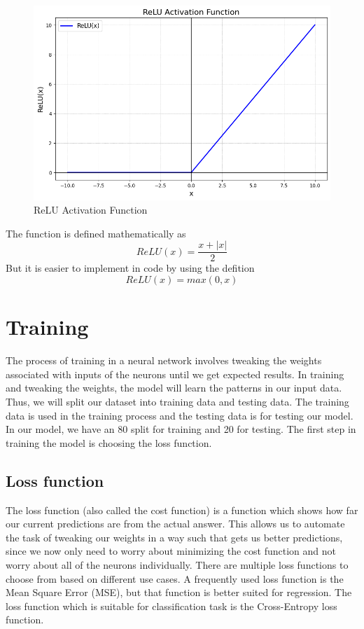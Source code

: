 \documentclass[a4paper,oneside,12pt]{report}
\begin{document}
\begin{figure}[htbp]
\centering
\includegraphics[width=.9\linewidth]{Neural_Network/2025-04-26_21-13-41_Relu-activation-function.png}
\caption{\label{fig:org78b14c4}ReLU Activation Function}
\end{figure}

The function is defined mathematically as
\[ ReLU(x) = \frac{x + |x|}{2} \]
But it is easier to implement in code by using the defition
\[ ReLU(x) = max(0, x) \]

\section{Training}
\label{sec:org5412e85}
The process of training in a neural network involves tweaking the weights associated with inputs of the neurons until we get expected results. In training and tweaking the weights, the model will learn the patterns in our input data. Thus, we will split our dataset into training data and testing data. The training data is used in the training process and the testing data is for testing our model. In our model, we have an 80 split for training and 20 for testing. The first step in training the model is choosing the loss function.

\subsection{Loss function}
\label{sec:org32a7fde}
The loss function (also called the cost function) is a function which shows how far our current predictions are from the actual answer. This allows us to automate the task of tweaking our weights in a way such that gets us better predictions, since we now only need to worry about minimizing the cost function and not worry about all of the neurons individually. There are multiple loss functions to choose from based on different use cases. A frequently used loss function is the Mean Square Error (MSE), but that function is better suited for regression. The loss function which is suitable for classification task is the Cross-Entropy loss function.
\end{document}
